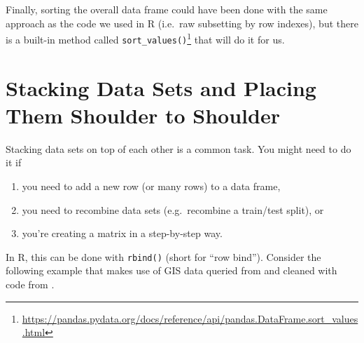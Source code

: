 \documentclass[12pt,krantz2]{krantz}
\providecommand{\tightlist}{%
  \setlength{\itemsep}{0pt}\setlength{\parskip}{0pt}}
\renewcommand{\href}[2]{#2\footnote{\url{#1}}}
\begin{document}
Finally, sorting the overall data frame could have been done with the same approach as the code we used in R (i.e.~raw subsetting by row indexes), but there is a built-in method called \href{https://pandas.pydata.org/docs/reference/api/pandas.DataFrame.sort_values.html}{\texttt{sort\_values()}} that will do it for us.

\hypertarget{stacking-data-sets-and-placing-them-shoulder-to-shoulder}{%
\section{Stacking Data Sets and Placing Them Shoulder to Shoulder}\label{stacking-data-sets-and-placing-them-shoulder-to-shoulder}}

Stacking data sets on top of each other is a common task. You might need to do it if

\begin{enumerate}
\def\labelenumi{\arabic{enumi}.}
\tightlist
\item
  you need to add a new row (or many rows) to a data frame,
\item
  you need to recombine data sets (e.g.~recombine a train/test split), or
\item
  you're creating a matrix in a step-by-step way.
\end{enumerate}

In R, this can be done with \texttt{rbind()} (short for ``row bind''). Consider the following example that makes use of GIS data queried from \citep{albemarle_county_gis_web} and cleaned with code from \citep{clay_ford}.
\end{document}
